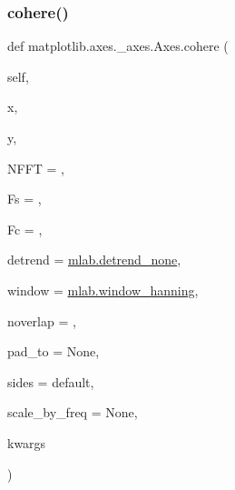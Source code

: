 \subsubsection{\texorpdfstring{cohere()}{cohere()}}
{\footnotesize\ttfamily def matplotlib.\+axes.\+\_\+axes.\+Axes.\+cohere (\begin{DoxyParamCaption}\item[{}]{self,  }\item[{}]{x,  }\item[{}]{y,  }\item[{}]{N\+F\+FT = {},  }\item[{}]{Fs = {},  }\item[{}]{Fc = {},  }\item[{}]{detrend = {\ttfamily \hyperlink{namespacematplotlib_1_1mlab_a359979aa8e0e635738648ca88ebd5e1d}{mlab.\+detrend\+\_\+none}},  }\item[{}]{window = {\ttfamily \hyperlink{namespacematplotlib_1_1mlab_a0be4c7ab27102a4d8ceb0a08a32ac0fc}{mlab.\+window\+\_\+hanning}},  }\item[{}]{noverlap = {},  }\item[{}]{pad\+\_\+to = {\ttfamily None},  }\item[{}]{sides = {\ttfamily \textquotesingle{}default\textquotesingle{}},  }\item[{}]{scale\+\_\+by\+\_\+freq = {\ttfamily None},  }\item[{}]{kwargs }\end{DoxyParamCaption})}


